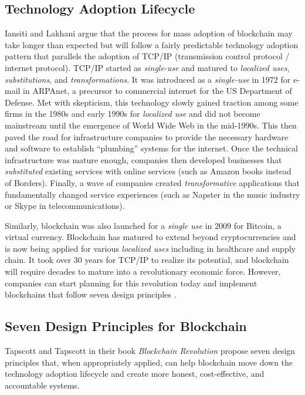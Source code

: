 \documentclass[sigconf]{acmart}
\begin{document}
\subsection{Technology Adoption Lifecycle}
Iansiti and Lakhani \cite{hbr} argue that the process for mass adoption of blockchain may take longer than expected but will follow a fairly predictable technology adoption pattern that parallels the adoption of TCP/IP (transmission control protocol / internet protocol). TCP/IP started as \textit{single-use} and matured to \textit{localized uses}, \textit{substitutions}, and \textit{transformations}. It was introduced as a \textit{single-use} in 1972 for e-mail in ARPAnet, a precursor to commercial internet for the US Department of Defense. Met with skepticism, this technology slowly gained traction among some firms in the 1980s and early 1990s for \textit{localized use} and did not become mainstream until the emergence of World Wide Web in the mid-1990s. This then paved the road for infrastructure companies to provide the necessary hardware and software to establish ``plumbing'' systems for the internet. Once the technical infrastructure was mature enough, companies then developed businesses that \textit{substituted} existing services with online services (such as Amazon books instead of Borders). Finally, a wave of companies created \textit{transformative} applications that fundamentally changed service experiences (such as Napster in the music industry or Skype in telecommunications).

Similarly, blockchain was also launched for a \textit{single use} in 2009 for Bitcoin, a virtual currency. Blockchain has matured to extend beyond cryptocurrencies and is now being applied for various \textit{localized uses} including in healthcare and supply chain. It took over 30 years for TCP/IP to realize its potential, and blockchain will require decades to mature into a revolutionary economic force. However, companies can start planning for this revolution today and implement blockchains that follow seven design principles \cite{hbr} \cite{tapscott}.

\subsection{Seven Design Principles for Blockchain}
Tapscott and Tapscott \cite{tapscott} in their book \textit{Blockchain Revolution} propose seven design principles that, when appropriately applied, can help blockchain move down the technology adoption lifecycle and create more honest, cost-effective, and accountable systems.
\end{document}
